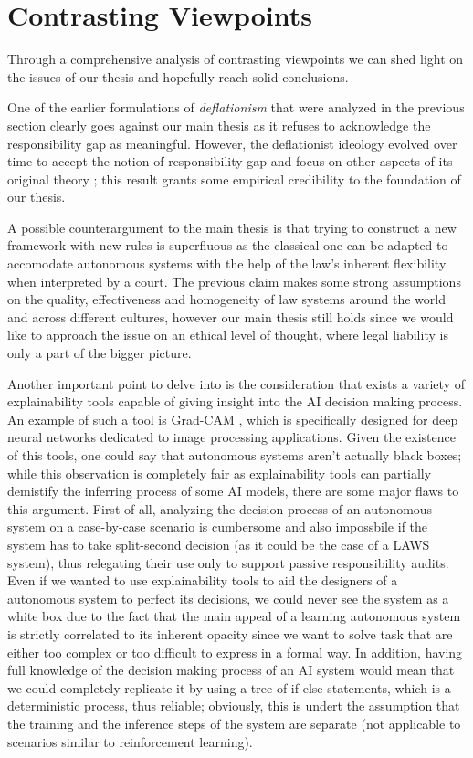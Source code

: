 \section{Contrasting Viewpoints}\label{sec:viewpoints}

Through a comprehensive analysis of contrasting viewpoints we can shed light on the issues of our thesis and hopefully reach solid conclusions.

One of the earlier formulations of \textit{deflationism} \parencite{HAYTMP} that were analyzed in the previous section clearly goes against our main thesis as it refuses to acknowledge the responsibility gap as meaningful.
However, the deflationist ideology evolved over time to accept the notion of responsibility gap and focus on other aspects of its original theory \parencite{SIJWA}; this result grants some empirical credibility to the foundation of our thesis.

A possible counterargument to the main thesis is that trying to construct a new framework with new rules is superfluous as the classical one can be adapted to accomodate autonomous systems with the help of the law's inherent flexibility when interpreted by a court.
The previous claim makes some strong assumptions on the quality, effectiveness and homogeneity of law systems around the world and across different cultures, however our main thesis still holds since we would like to approach the issue on an ethical level of thought, where legal liability is only a part of the bigger picture.

Another important point to delve into is the consideration that exists a variety of explainability tools capable of giving insight into the AI decision making process.
An example of such a tool is Grad-CAM \parencite{RAMGCW}, which is specifically designed for deep neural networks dedicated to image processing applications.
Given the existence of this tools, one could say that autonomous systems aren't actually black boxes; while this observation is completely fair as explainability tools can partially demistify the inferring process of some AI models, there are some major flaws to this argument.
First of all, analyzing the decision process of an autonomous system on a case-by-case scenario is cumbersome and also impossbile if the system has to take split-second decision (as it could be the case of a LAWS system), thus relegating their use only to support passive responsibility audits.
Even if we wanted to use explainability tools to aid the designers of a autonomous system to perfect its decisions, we could never see the system as a white box due to the fact that the main appeal of a learning autonomous system is strictly correlated to its inherent opacity since we want to solve task that are either too complex or too difficult to express in a formal way.
In addition, having full knowledge of the decision making process of an AI system would mean that we could completely replicate it by using a tree of if-else statements, which is a deterministic process, thus reliable; obviously, this is undert the assumption that the training and the inference steps of the system are separate (not applicable to scenarios similar to reinforcement learning).